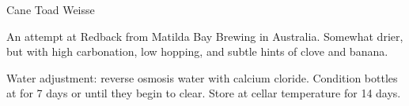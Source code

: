 \begin{recipe}{Cane Toad Weisse} %

\begin{aboutblock}
An attempt at Redback from Matilda Bay Brewing in Australia. Somewhat drier,
but with high carbonation, low hopping, and subtle hints of clove and banana.
\end{aboutblock}


\begin{methodandtiming}
 
\begin{mashsteps}
\end{mashsteps}

\begin{fermentationsteps}
\end{fermentationsteps}

\begin{directions}
Water adjustment: reverse osmosis water with  calcium cloride.
Condition bottles at  for 7 days or until they begin to clear. Store
at cellar temperature for 14 days.
\end{directions}

\end{methodandtiming}

\recipebreak

\begin{ingredientsblock}
    
\begin{malts}
\end{malts}

\begin{hops}
\end{hops}


\end{ingredientsblock}

\end{recipe}

